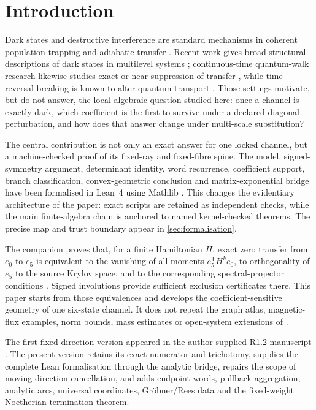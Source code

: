 \section{Introduction}\label{sec:introduction}

Dark states and destructive interference are standard mechanisms in coherent
population trapping and adiabatic transfer \parencite{Aspect1988,Gaubatz1990}.
Recent work gives broad structural descriptions of dark states in multilevel
systems \parencite{Zhao2026}; continuous-time quantum-walk research likewise
studies exact or near suppression of transfer \parencite{Sett2019,Godsil2012},
while time-reversal breaking is known to alter quantum transport
\parencite{Zimboras2013}.  Those settings motivate, but do not answer, the
local algebraic question studied here: once a channel is exactly dark, which
coefficient is the first to survive under a declared diagonal perturbation,
and how does that answer change under multi-scale substitution?

The central contribution is not only an exact answer for one locked channel,
but a machine-checked proof of its fixed-ray and fixed-fibre spine.  The model,
signed-symmetry argument, determinant identity, word recurrence, coefficient
support, branch classification, convex-geometric conclusion and
matrix-exponential bridge have been formalised in Lean~4
\parencite{deMouraUllrich2021} using Mathlib
\parencite{MathlibCommunity2020}.  This changes the evidentiary architecture of
the paper: exact scripts are retained as independent checks, while the main
finite-algebra chain is anchored to named kernel-checked theorems.  The precise
map and trust boundary appear in \cref{sec:formalisation}.

The companion \paperone{} proves that, for a finite Hamiltonian $H$, exact
zero transfer from $e_0$ to $e_5$ is equivalent to the vanishing of all
moments $e_5^{\mathsf T}H^ke_0$, to orthogonality of $e_5$ to the source
Krylov space, and to the corresponding spectral-projector conditions
\parencite{MedfordPaperI}.  Signed involutions provide sufficient exclusion
certificates there.  This paper starts from those equivalences and develops the
coefficient-sensitive geometry of one six-state channel.  It does not repeat
the graph atlas, magnetic-flux examples, norm bounds, mass estimates or
open-system extensions of \paperone.

The first fixed-direction version appeared in the author-supplied R1.2
manuscript \parencite{MedfordR12}.  The present version retains its exact
numerator and trichotomy, supplies the complete Lean formalisation through the
analytic bridge, repairs the scope of moving-direction cancellation, and adds
endpoint words, pullback aggregation, analytic arcs, universal coordinates,
Gr\"obner/Rees data and the fixed-weight Noetherian termination theorem.

